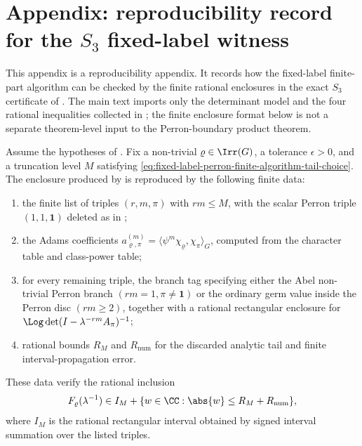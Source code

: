 \section{Appendix: reproducibility record for the \texorpdfstring{\(S_3\)}{S3} fixed-label witness}
\label{app:fixed-label-local-certificates}

This appendix is a reproducibility appendix.  It records how the fixed-label
finite-part algorithm can be checked by the finite rational enclosures in the
exact \(S_3\) certificate of .  The main text
imports only the determinant model and the four rational inequalities collected
in ; the finite enclosure
format below is not a separate theorem-level input to the Perron-boundary
product theorem.

\begin{lemma}\label{prop:fixed-label-rational-certificate-record}
\label{prop:fixed-label-finite-io-certificate-summary}
  Assume the hypotheses of .  Fix a
  non-trivial \(\varrho\in\Irr(G)\), a tolerance \(\epsilon>0\), and a
  truncation level \(M\) satisfying
  \eqref{eq:fixed-label-perron-finite-algorithm-tail-choice}.  The enclosure
  produced by  is reproduced by
  the following finite data:
  \begin{enumerate}[label=\textup{(\roman*)},leftmargin=*]
    \item the finite list of triples \((r,m,\pi)\) with \(rm\le M\), with the
      scalar Perron triple \((1,1,\mathbf1)\) deleted as in
      ;
    \item the Adams coefficients
      \(a_{\varrho,\pi}^{(m)}
      =\langle\psi^m\chi_\varrho,\chi_\pi\rangle_G\), computed from the
      character table and class-power table;
    \item for every remaining triple, the branch tag specifying either the
      Abel non-trivial Perron branch \((rm=1,\pi\ne\mathbf1)\) or the ordinary
      germ value inside the Perron disc \((rm\ge2)\), together with a rational
      rectangular enclosure for
      \(\Log\det(I-\lambda^{-rm}A_\pi)^{-1}\);
    \item rational bounds \(R_M\) and \(R_{\mathrm{num}}\) for the discarded
      analytic tail and finite interval-propagation error.
  \end{enumerate}
  These data verify the rational inclusion
  \begin{equation}\label{eq:fixed-label-certificate-interface-inclusion}
    F_\varrho(\lambda^{-1})
    \in
    I_M+\{w\in\CC:\abs{w}\le R_M+R_{\mathrm{num}}\},
  \end{equation}
  where \(I_M\) is the rational rectangular interval obtained by signed
  interval summation over the listed triples.
\end{lemma}

